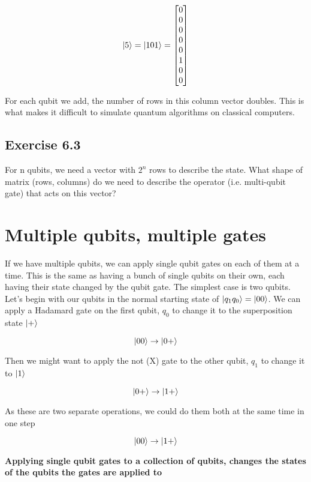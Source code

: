 \documentclass{book}
\begin{document}
$$ \ket{5} = \ket{101} = \begin{bmatrix} 0 \\ 0\\ 0\\ 0\\ 0\\ 1\\0\\0 \end{bmatrix} $$

For each qubit we add, the number of rows in this column vector doubles. This is what makes it difficult to simulate quantum algorithms on classical computers. \newline

\hline

\subsection{Exercise 6.3}

For n qubits, we need a vector with $2^n$ rows to describe the state. What shape of matrix (rows, columns) do we need to describe the operator (i.e. multi-qubit gate) that acts on this vector? \newline

\hline

\section{ Multiple qubits, multiple gates }


If we have multiple qubits, we can apply single qubit gates on each of them at a time. This is the same as having a bunch of single qubits on their own, each having their state changed by the qubit gate. The simplest case is two qubits. Let's begin with our qubits in the normal starting state of $\ket{q_1q_0} = \ket{00}$. We can apply a Hadamard gate on the first qubit, $q_0$ to change it to the superposition state $\ket{+}$

$$ \ket{00} \rightarrow \ket{0+} $$ 

Then we might want to apply the not (X) gate to the other qubit, $q_1$ to change it to $\ket{1}$

$$ \ket{0+} \rightarrow \ket{1+} $$

As these are two separate operations, we could do them both at the same time in one step 

$$  \ket{00} \rightarrow \ket{1+} $$

\textbf{Applying single qubit gates to a collection of qubits, changes the states of the qubits the gates are applied to}
\end{document}
